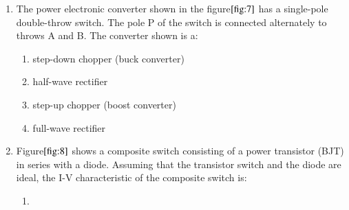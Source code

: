 \documentclass[journal]{IEEEtran}
\numberwithin{equation}{enumi}
\numberwithin{figure}{enumi}
\begin{document}
\begin{enumerate}
    \item The power electronic converter shown in the figure$\ref{fig:7}$ has a single-pole double-throw switch. The pole P of the switch is connected alternately to throws A and B. The converter shown is a:
    \begin{figure}[!ht]
    
			\centering
			
			\caption{}
			\label{fig:7}
		\end{figure}
    \begin{enumerate}
        \item step-down chopper (buck converter)
        \item half-wave rectifier
        \item step-up chopper (boost converter)
        \item full-wave rectifier
    \end{enumerate}

    \item Figure$\ref{fig:8}$ shows a composite switch consisting of a power transistor (BJT) in series with a diode. Assuming that the transistor switch and the diode are ideal, the I-V characteristic of the composite switch is:
    \begin{figure}[H]
    
			\centering
			
			\caption{}
			\label{fig:8}
		\end{figure}
    


\begin{enumerate}

    \item[]

    \begin{figure}[H]
        \centering


\end{figure}
\end{enumerate}
\end{enumerate}
\end{document}
